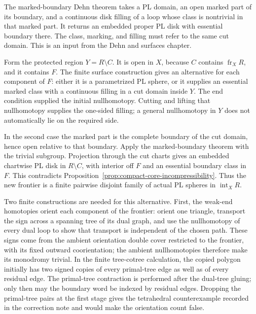 The marked-boundary Dehn theorem takes a PL domain, an open marked part
of its boundary, and a continuous disk filling of a loop whose class is
nontrivial in that marked part. It returns an embedded proper PL disk
with essential boundary there. The class, marking, and filling must
refer to the same cut domain. This is an input from the Dehn and surfaces
chapter.

Form the protected region $Y=R\setminus C$. It is open in $X$, because
$C$ contains $\operatorname{fr}_X R$, and it contains $F$. The finite
surface construction gives an alternative for each component of $F$:
either it is a parametrized PL sphere, or it supplies an essential marked
class with a continuous filling in a cut domain inside $Y$. The end
condition supplied the initial nullhomotopy. Cutting and lifting that
nullhomotopy supplies the one-sided filling; a general nullhomotopy in
$Y$ does not automatically lie on the required side.

In the second case the marked part is the complete boundary of the cut
domain, hence open relative to that boundary. Apply the marked-boundary
theorem with the trivial subgroup. Projection through the cut charts
gives an embedded chartwise PL disk in $R\setminus C$, with interior off
$F$ and an essential boundary class in $F$. This contradicts
Proposition~\ref{prop:compact-core-incompressibility}. Thus the new
frontier is a finite pairwise disjoint family of actual PL spheres in
$\operatorname{int}_X R$.

Two finite constructions are needed for this alternative. First, the
weak-end homotopies orient each component of the frontier: orient one
triangle, transport the sign across a spanning tree of its dual graph, and
use the nullhomotopy of every dual loop to show that transport is independent
of the chosen path. These signs come from the ambient orientation double
cover restricted to the frontier, with its fixed outward coorientation;
the ambient nullhomotopies therefore make its monodromy trivial.
In the finite tree-cotree calculation, the copied polygon
initially has two signed copies of every primal-tree edge as well as of every
residual edge. The primal-tree contraction is performed after the dual-tree
gluing; only then may the boundary word be indexed by residual edges. Dropping
the primal-tree pairs at the first stage gives the tetrahedral counterexample
recorded in the correction note and would make the orientation count false.

